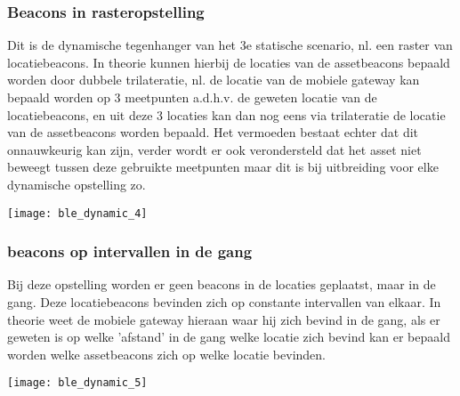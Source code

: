 \subsubsection{Beacons in rasteropstelling}
\begin{minipage}{0.65\textwidth}
Dit is de dynamische tegenhanger van het 3e statische scenario, nl. een raster van locatiebeacons. In theorie kunnen hierbij de locaties van de assetbeacons bepaald worden door dubbele trilateratie, nl. de locatie van de mobiele gateway kan bepaald worden op 3 meetpunten a.d.h.v. de geweten locatie van de locatiebeacons, en uit deze 3 locaties kan dan nog eens via trilateratie de locatie van de assetbeacons worden bepaald. Het vermoeden bestaat echter dat dit onnauwkeurig kan zijn, verder wordt er ook verondersteld dat het asset niet beweegt tussen deze gebruikte meetpunten maar dit is bij uitbreiding voor elke dynamische opstelling zo.
\end{minipage}
\hfill
\begin{minipage}{0.30\textwidth}
	\texttt{[image: ble\_dynamic\_4]}
\end{minipage}

\subsubsection{beacons op intervallen in de gang}
\begin{minipage}{0.65\textwidth}
Bij deze opstelling worden er geen beacons in de locaties geplaatst, maar in de gang. Deze locatiebeacons bevinden zich op constante intervallen van elkaar. In theorie weet de mobiele gateway hieraan waar hij zich bevind in de gang, als er geweten is op welke 'afstand' in de gang welke locatie zich bevind kan er bepaald worden welke assetbeacons zich op welke locatie bevinden.
\end{minipage}
\hfill
\begin{minipage}{0.30\textwidth}
	\texttt{[image: ble\_dynamic\_5]}
\end{minipage}